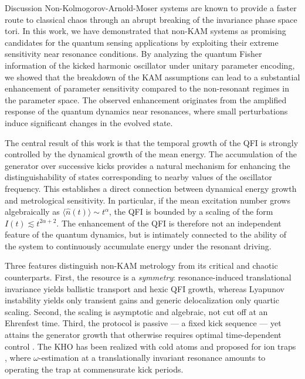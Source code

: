 \documentclass[amsmath,nobibnotes,aps,amssymb,pra, prl,aps,showpacs,superscriptaddress,twocolumn, longbibliography, reprint]{revtex4-2}
\begin{document}
\begin{section}{Discussion}
\label{section-6}
Non-Kolmogorov-Arnold-Moser systems are known to provide a faster route to classical chaos through an abrupt breaking of the invariance phase space tori. In this work, we have demonstrated that non-KAM systems as promising candidates for the quantum sensing applications by exploiting their extreme sensitivity near resonance conditions.
By analyzing the quantum Fisher information of the kicked harmonic oscillator under unitary parameter encoding, we showed that the breakdown of the KAM assumptions can lead to a substantial enhancement of parameter sensitivity compared to the non-resonant regimes in the parameter space. The observed enhancement originates from the amplified response of the quantum dynamics near resonances, where small perturbations induce significant changes in the evolved state.




The central result of this work is that the temporal growth of the QFI is strongly controlled by the dynamical growth of the mean energy. The accumulation of the generator over successive kicks provides a natural mechanism for enhancing the distinguishability of states corresponding to nearby values of the oscillator frequency. This establishes a direct connection between dynamical energy growth and metrological sensitivity. In particular, if the mean excitation number grows algebraically as $\langle \hat n(t)\rangle\sim t^\alpha$, the QFI is bounded by a scaling of the form $I(t)\lesssim t^{2\alpha+2}$. The enhancement of the QFI is therefore not an independent feature of the quantum dynamics, but is intimately connected to the ability of the system to continuously accumulate energy under the resonant driving.



Three features distinguish non-KAM metrology from its critical and chaotic
counterparts. First, the resource is a \emph{symmetry}: resonance-induced
translational invariance yields ballistic transport and hexic QFI growth,
whereas Lyapunov instability yields only transient gains
\cite{fiderer2018quantum} and generic delocalization only quartic scaling.
Second, the scaling is asymptotic and algebraic, not cut off at an
Ehrenfest time. Third, the protocol is passive --- a fixed kick sequence
--- yet attains the generator growth that otherwise requires optimal
time-dependent control \cite{pang2017optimal}. The KHO has been realized with cold atoms and
proposed for ion traps \cite{Gardiner1997, duffy2004nonlinear, billam2009quantum}, where
$\omega$-estimation at a translationally invariant resonance amounts to
operating the trap at commensurate kick periods.



\end{section}
\end{document}
